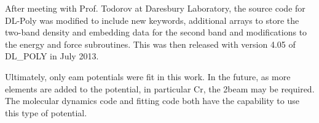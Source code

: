 After meeting with Prof. Todorov at Daresbury Laboratory, the source code for DL-Poly was modified to include new keywords, additional arrays to store the two-band density and embedding data for the second band and modifications to the energy and force subroutines.  This was then released with version 4.05 of DL\_POLY in July 2013.  

Ultimately, only \acrshort{eam} potentials were fit in this work.  In the future, as more elements are added to the potential, in particular Cr, the \acrshort{2beam} may be required.  The molecular dynamics code and fitting code both have the capability to use this type of potential.







